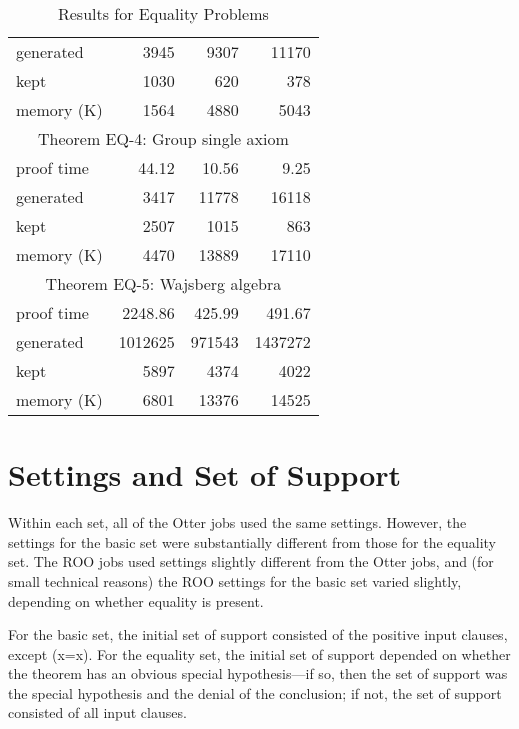 \begin{table}[htbp]
\begin{tabular}{lrrr}
generated   &  3945      &    9307        &    11170       	   \\
kept        &  1030      &    620         &    378         	   \\
memory (K)  &  1564      &    4880        &    5043                \\
\hline
     \multicolumn{4}{c}{Theorem EQ-4: Group single axiom} \\
proof time  &  44.12     &    10.56       &    9.25        	   \\
generated   &  3417      &    11778       &    16118       	   \\
kept        &  2507      &    1015        &    863         	   \\
memory (K)  &  4470      &    13889       &    17110       	   \\
\hline
     \multicolumn{4}{c}{Theorem EQ-5: Wajsberg algebra} \\
proof time  &  2248.86   &    425.99      &    491.67      	   \\
generated   &  1012625   &    971543      &    1437272     	   \\
kept        &  5897      &    4374        &    4022        	   \\
memory (K)  &  6801      &    13376       &    14525       	   \\
\end{tabular}
\caption{Results for Equality Problems}
\end{table}

\section{Settings and Set of Support} \label{settings}

Within each set, all of the Otter jobs used the same settings.
However, the settings for the basic set were substantially different
from those for the equality set.  The ROO jobs used settings slightly
different from the Otter jobs, and (for small technical reasons)
the ROO settings for the basic set varied slightly, depending on whether
equality is present.

For the basic set, the initial set of support consisted of the positive
input clauses, except (x=x).
For the equality set, the initial set of support depended on whether
the theorem has an obvious special hypothesis---if so, then the set of
support was the special hypothesis and the denial of the conclusion;
if not, the set of support consisted of all input clauses.

